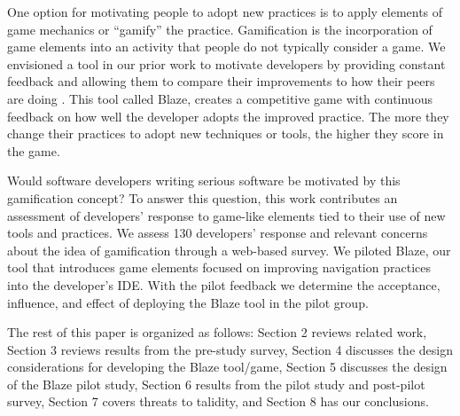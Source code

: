 \documentclass{sig-alternate}
\begin{document}
One option for motivating people to adopt new practices is to apply elements of game mechanics or ``gamify'' the practice. Gamification is the incorporation of game elements into an activity that people do not typically consider a game\cite{2013Oxford}.  We envisioned a tool in our prior work to motivate developers by providing constant feedback and allowing them to compare their improvements to how their peers are doing  \cite{Snipes2013Towards}.  This tool called Blaze, creates a competitive game with continuous feedback on how well the developer adopts the improved practice.  The more they change their practices to adopt new techniques or tools, the higher they score in the game. 

Would software developers writing serious software be motivated by this gamification concept? To answer this question, this work contributes an assessment of developers' response to game-like elements tied to their use of new tools and practices.  We assess 130 developers' response and relevant concerns about the idea of gamification through a web-based survey.  We piloted Blaze, our tool that introduces game elements focused on improving navigation practices into the developer's IDE.  With the pilot feedback we determine the acceptance, influence, and effect of deploying the Blaze tool in the pilot group.

The rest of this paper is organized as follows:  Section 2 reviews related work, Section 3 reviews results from the pre-study survey, Section 4 discusses the design considerations for developing the Blaze tool/game, Section 5 discusses the design of the Blaze pilot study,  Section 6 results from the pilot study and post-pilot survey, Section 7 covers threats to talidity, and Section 8 has our conclusions.
%
%
%
\end{document}
